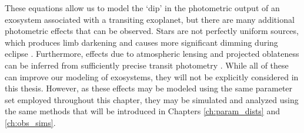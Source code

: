 These equations allow us to model the `dip' in the photometric output of an exosystem associated with a transiting exoplanet, but there are many additional photometric effects that can be observed.  Stars are not perfectly uniform sources, which produces limb darkening and  causes more significant dimming during eclipse \citep{mandel2002analytic,claret2008testing}.  Furthermore, effects due to atmospheric lensing and projected oblateness can be inferred from sufficiently precise transit photometry \citep{hui2002atmospheric}.  While all of these can improve our modeling of exosystems, they will not be explicitly considered in this thesis.  However, as these effects may be modeled using the same parameter set employed throughout this chapter, they may be simulated and analyzed using the same methods that will be introduced in Chapters \ref{ch:param_dists} and \ref{ch:obs_sims}.

